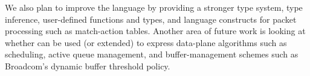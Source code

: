 We also plan to improve the \pktlanguage language by providing a stronger type
system, type inference, user-defined functions and types, and language
constructs for packet processing such as match-action tables. Another area of
future work is looking at whether \pktlanguage can be used (or extended) to
express data-plane algorithms such as scheduling, active queue management, and
buffer-management schemes such as Broadcom's dynamic buffer threshold policy.

